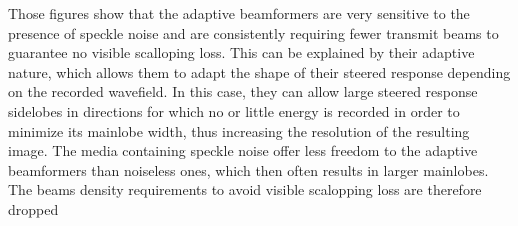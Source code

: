 Those figures show that the adaptive beamformers are very sensitive to the presence of speckle noise and are consistently requiring fewer transmit beams to guarantee no visible scalloping loss.
This can be explained by their adaptive nature, which allows them to adapt the shape of their steered response depending on the recorded wavefield. In this case, they can allow large steered response sidelobes in directions for which no or little energy is recorded in order to minimize its mainlobe width, thus increasing the resolution of the resulting image. The media containing speckle noise offer less freedom to the adaptive beamformers than noiseless ones, which then often results in larger mainlobes. The beams density requirements to avoid visible scalopping loss are therefore dropped
\fi